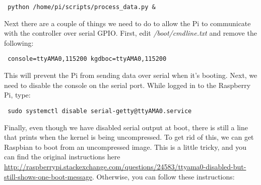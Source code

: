 \documentclass[10pt]{article}
\begin{document}
\begin{verbatim}
 python /home/pi/scripts/process_data.py &
\end{verbatim}

Next there are a couple of things we need to do to allow the Pi to communicate with the controller over serial GPIO. First, edit \textit{/boot/cmdline.txt} and remove
the following:

\begin{verbatim}
 console=ttyAMA0,115200 kgdboc=ttyAMA0,115200
\end{verbatim}

This will prevent the Pi from sending data over serial when it's booting. Next, we need to disable the console on the serial port. While logged in to the Raspberry Pi,
type:

\begin{verbatim}
 sudo systemctl disable serial-getty@ttyAMA0.service
\end{verbatim}

Finally, even though we have disabled serial output at boot, there is still a line that prints when the kernel is being uncompressed. To get rid of this, we can 
get Raspbian to boot from an uncompressed image. This is a little tricky, and you can find the original instructions here 
\url{http://raspberrypi.stackexchange.com/questions/24583/ttyama0-disabled-but-still-shows-one-boot-message}. Otherwise, you can follow these instructions:
\end{document}
